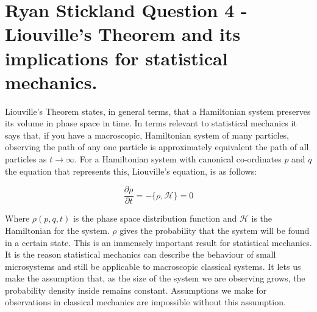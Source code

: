 \section{Ryan Stickland Question 4 - Liouville's Theorem and its implications for statistical mechanics.}

Liouville's Theorem states, in general terms, that a Hamiltonian system preserves its volume in phase space in time. In terms relevant to statistical mechanics it says that, if you have a macroscopic, Hamiltonian system of many particles, observing the path of any one particle is approximately equivalent the path of all particles as $t\to\infty$. For a Hamiltonian system with canonical co-ordinates $p$ and $q$ the equation that represents this, Liouville’s equation, is as follows:

$$\frac{\partial\rho}{\partial t}=-\{\rho,\mathcal{H}\}=0$$

Where $\rho(p,q,t)$ is the phase space distribution function and $\mathcal{H}$ is the Hamiltonian for the system. $\rho$ gives the probability that the system will be found in a certain state. This is an immensely important result for statistical mechanics. It is the reason statistical mechanics can describe the behaviour of small microsystems and still be applicable to macroscopic classical systems. It lets us make the assumption that, as the size of the system we are observing grows, the probability density inside remains constant. Assumptions we make for observations in classical mechanics are impossible without this assumption.
